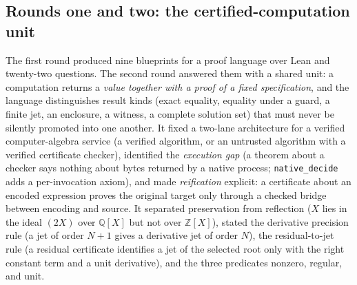 \documentclass[11pt,a4paper]{article}
\newcommand{\code}[1]{\nolinkurl{#1}}
\newcommand{\Z}{\mathbb Z}
\newcommand{\Q}{\mathbb Q}
\theoremstyle{definition}
\theoremstyle{plain}
\begin{document}
\subsection{Rounds one and two: the certified-computation unit}
The first round produced nine blueprints for a proof language over Lean and twenty-two questions. The second round answered them with a shared unit: a computation returns a \emph{value together with a proof of a fixed specification}, and the language distinguishes result kinds (exact equality, equality under a guard, a finite jet, an enclosure, a witness, a complete solution set) that must never be silently promoted into one another. It fixed a two-lane architecture for a verified computer-algebra service (a verified algorithm, or an untrusted algorithm with a verified certificate checker), identified the \emph{execution gap} (a theorem about a checker says nothing about bytes returned by a native process; \code{native_decide} adds a per-invocation axiom), and made \emph{reification} explicit: a certificate about an encoded expression proves the original target only through a checked bridge between encoding and source. It separated preservation from reflection ($X$ lies in the ideal $(2X)$ over $\Q[X]$ but not over $\Z[X]$), stated the derivative precision rule (a jet of order $N+1$ gives a derivative jet of order $N$), the residual-to-jet rule (a residual certificate identifies a jet of the selected root only with the right constant term and a unit derivative), and the three predicates nonzero, regular, and unit.
\end{document}
